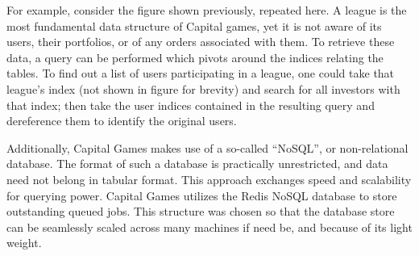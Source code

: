 For example, consider the figure shown previously, repeated here.
A league is the most fundamental data structure of Capital games,
yet it is not aware of its users, their portfolios, or of any
orders associated with them. To retrieve these data, a query can
be performed which pivots around the indices relating the tables.
To find out a list of users participating in a league, one could
take that league's index (not shown in figure for brevity) and
search for all investors with that index; then take the user
indices contained in the resulting query and dereference them
to identify the original users. 

Additionally, Capital Games makes use of a so-called ``NoSQL'',
or non-relational database. The format of such a database is
practically unrestricted, and data need not belong in tabular
format. This approach exchanges speed and scalability for
querying power. \cite{wiki:nosql} Capital Games utilizes the
Redis NoSQL database to store outstanding queued jobs. This
structure was chosen so that the database store can be
seamlessly scaled across many machines if need be, and
because of its light weight. 